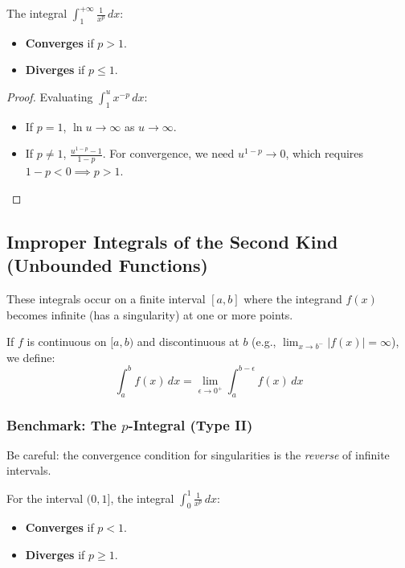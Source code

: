 \documentclass[oneside]{book}
\begin{document}
\begin{theorem}
The integral $\int_1^{+\infty} \frac{1}{x^p} \, dx$:
\begin{itemize}
    \item \textbf{Converges} if $p > 1$.
    \item \textbf{Diverges} if $p \leq 1$.
\end{itemize}
\end{theorem}
\begin{proof}
Evaluating $\int_1^u x^{-p} \, dx$:
\begin{itemize}
    \item If $p=1$, $\ln u \to \infty$ as $u \to \infty$.
    \item If $p \neq 1$, $\frac{u^{1-p}-1}{1-p}$. For convergence, we need $u^{1-p} \to 0$, which requires $1-p < 0 \implies p > 1$.
\end{itemize}
\end{proof}

\subsection{Improper Integrals of the Second Kind (Unbounded Functions)}

These integrals occur on a finite interval $[a,b]$ where the integrand $f(x)$ becomes infinite (has a singularity) at one or more points.

\begin{definition}
If $f$ is continuous on $[a, b)$ and discontinuous at $b$ (e.g., $\lim_{x \to b^-} |f(x)| = \infty$), we define:
\[
\int_a^b f(x) \, dx = \lim_{\epsilon \to 0^+} \int_a^{b-\epsilon} f(x) \, dx
\]
\end{definition}

\subsubsection{Benchmark: The $p$-Integral (Type II)}
Be careful: the convergence condition for singularities is the \textit{reverse} of infinite intervals.

\begin{theorem}
For the interval $(0, 1]$, the integral $\int_0^1 \frac{1}{x^p} \, dx$:
\begin{itemize}
    \item \textbf{Converges} if $p < 1$.
    \item \textbf{Diverges} if $p \geq 1$.
\end{itemize}
\end{theorem}
\end{document}
